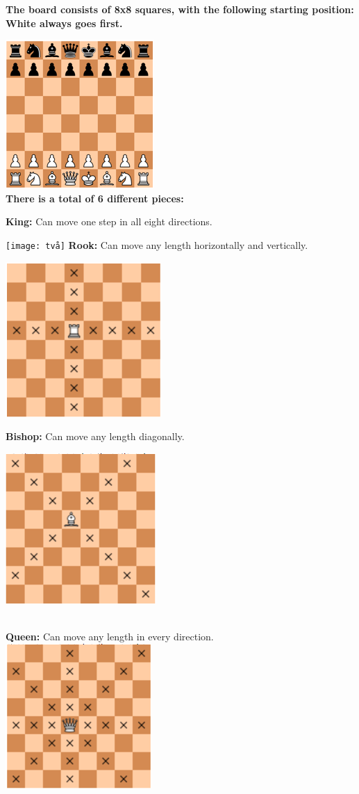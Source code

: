 \documentclass{article}
\begin{document}
\Large
\newpage
\noindent
\textbf{The board consists of 8x8 squares, with the following 
starting position: White always goes first.}

\includegraphics{ett}
\\
\textbf{There is a total of 6 different pieces:}

\textbf{King:} Can move one step in all eight directions.

\texttt{[image: två]}
\newpage
\textbf{Rook:} Can move any length horizontally and vertically. 

\includegraphics{tre}

\textbf{Bishop:} Can move any length diagonally. 

\includegraphics{fyra}

\newpage
\noindent
\\
\textbf{Queen:} Can move any length in every direction.
\\
\includegraphics{fem}
\end{document}

